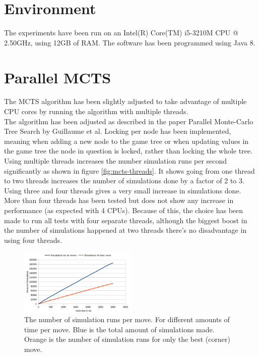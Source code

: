 \documentclass[
11pt, %
english, %
singlespacing, %
headsepline, %
]{MastersDoctoralThesis} %
\begin{document}
\section{Environment}
The experiments have been run on an Intel(R) Core(TM) i5-3210M CPU @ 2.50GHz, using 12GB of RAM. The software has been programmed using Java 8.

\section{Parallel MCTS}
The MCTS algorithm has been slightly adjusted to take advantage of multiple CPU cores by running the algorithm with multiple threads.\\

The algorithm has been adjusted as described in the paper Parallel Monte-Carlo Tree Search\cite{chaslot2008parallel} by Guillaume et al. Locking per node has been implemented, meaning when adding a new node to the game tree or when updating values in the game tree the node in question is locked, rather than locking the whole tree.\\

Using multiple threads increases the number simulation runs per second significantly as shown in figure \ref{fig:mcts-threads}. It shows going from one thread to two threads increases the number of simulations done by a factor of 2 to 3. Using three and four threads gives a very small increase in simulations done. More than four threads has been tested but does not show any increase in performance (as expected with 4 CPUs). Because of this, the choice has been made to run all tests with four separate threads, although the biggest boost in the number of simulations happened at two threads there's no disadvantage in using four threads.

\begin{figure}
	\centering
	\includegraphics[width=0.5\textwidth]{images/simulations-time}
	\caption{The number of simulation runs per move. For different amounts of time per move. Blue is the total amount of simulations made. Orange is the number of simulation runs for only the best (corner) move.}
	\label{fig:mcts-simulations-time}
\end{figure}
\end{document}
